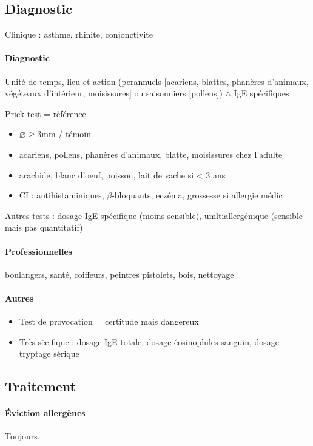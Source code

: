 \documentclass{article}
\begin{document}
\subsection{Diagnostic}
Clinique : asthme, rhinite, conjonctivite

\paragraph{Diagnostic}
Unité de temps, lieu et action (perannuels [acariens,
blattes, phanères d'animaux, végéteaux d'intérieur, moisissures] ou saisonniers
[pollens]) $\wedge$ IgE spécifiques

Prick-test = référence.
\begin{itemize}
  \item $\diameter \ge 3$mm / témoin
  \item acariens, pollens, phanères d'animaux, blatte, moisissures chez l'adulte
  \item arachide, blanc d'oeuf, poisson, lait de vache si < 3 ans
  \item CI : antihistaminiques, $\beta$-bloquants, eczéma, grossesse si
      allergie médic
\end{itemize}

Autres tests : dosage IgE spécifique (moins sensible), umltiallergénique (sensible mais
    pas quantitatif)

\paragraph{Professionnelles} boulangers, santé, coiffeurs, peintres pistolets, bois, nettoyage\\

\paragraph{Autres}
\begin{itemize}
  \item Test de provocation = certitude mais dangereux
  \item Très sécifique : dosage IgE totale, dosage éosinophiles sanguin, dosage tryptage sérique
\end{itemize}

\subsection{Traitement}
\paragraph{Éviction allergènes} Toujours.
\end{document}
